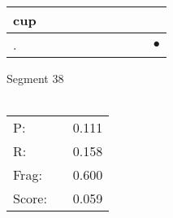 \documentclass[landscape]{article}
\newcommand{\ssp}{\hspace{2pt}}
\newcommand{\mex}{\cellcolor{g}$\bullet$}
\begin{document}
\begin{tabular}{|l|p{10pt}|p{10pt}|p{10pt}|p{10pt}|p{10pt}|p{10pt}|p{10pt}|p{10pt}|p{10pt}|}
\hline
\ssp cup \ssp&\hspace{2pt}&\hspace{2pt}&\hspace{2pt}&\hspace{2pt}&\hspace{2pt}&\hspace{2pt}&\hspace{2pt}&\hspace{2pt}&\hspace{2pt}\\
\hline
\ssp \cellcolor{ref8}. \ssp&\hspace{2pt}&\hspace{2pt}&\hspace{2pt}&\hspace{2pt}&\hspace{2pt}&\hspace{2pt}&\hspace{2pt}&\hspace{2pt}&\hspace{2pt}\mex\\
\hline
\end{tabular}

\vspace{6pt}
\noindent Segment 38\\\\
\noindent\begin{tabular}{lm{12pt}r}
\hline
P:&&0.111\\
R:&&0.158\\
Frag:&&0.600\\
Score:&&0.059\\
\end{tabular}

\newpage
\end{document}
